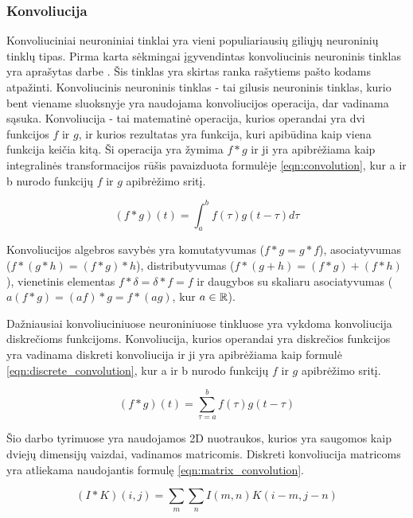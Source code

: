 \subsubsection{Konvoliucija}

Konvoliuciniai neuroniniai tinklai yra vieni populiariausių giliųjų neuroninių tinklų tipas. Pirma karta sėkmingai įgyvendintas konvoliucinis neuroninis tinklas yra aprašytas darbe \cite{cnn}. Šis tinklas yra skirtas ranka rašytiems pašto kodams atpažinti. Konvoliucinis neuroninis tinklas - tai gilusis neuroninis tinklas, kurio bent viename sluoksnyje yra naudojama konvoliucijos operacija, dar vadinama sąsuka. Konvoliucija - tai matematinė operacija, kurios operandai yra dvi funkcijos $f$ ir $g$, ir kurios rezultatas yra funkcija, kuri apibūdina kaip viena funkcija keičia kitą. Ši operacija yra žymima $f * g$ ir ji yra apibrėžiama kaip integralinės transformacijos rūšis pavaizduota formulėje \ref{eqn:convolution}, kur a ir b nurodo funkcijų  $f$ ir $g$ apibrėžimo sritį.

\begin{equation}
\label{eqn:convolution}
	(f * g)(t) = \int_{a}^{b} f(\tau)g(t - \tau) d\tau
\end{equation}

Konvoliucijos algebros savybės yra komutatyvumas ($f * g = g * f$), asociatyvumas ($f * (g * h) = (f * g) * h$), distributyvumas ($f * (g + h) = (f * g) + (f * h)$), vienetinis elementas $f * \delta = \delta * f = f$ ir daugybos su skaliaru asociatyvumas ($a(f * g) = (af) * g = f * (ag)$, kur $a \in \mathbb{R}$).

Dažniausiai konvoliuciniuose neuroniniuose tinkluose yra vykdoma konvoliucija diskrečioms funkcijoms. Konvoliucija, kurios operandai yra diskrečios funkcijos yra vadinama diskreti konvoliucija ir ji yra apibrėžiama kaip formulė \ref{eqn:discrete_convolution}, kur a ir b nurodo funkcijų  $f$ ir $g$ apibrėžimo sritį.

\begin{equation}
\label{eqn:discrete_convolution}
	(f * g)(t) = \sum_{\tau = a}^{b} f(\tau)g(t - \tau)
\end{equation}

Šio darbo tyrimuose yra naudojamos 2D nuotraukos, kurios yra saugomos kaip dviejų dimensijų vaizdai, vadinamos matricomis. Diskreti konvoliucija matricoms yra atliekama naudojantis formulę \ref{eqn:matrix_convolution}.

\begin{equation}
\label{eqn:matrix_convolution}
	(I * K)(i, j) = \sum_{m} \sum_{n} I(m, n) K(i - m, j - n)
\end{equation}

